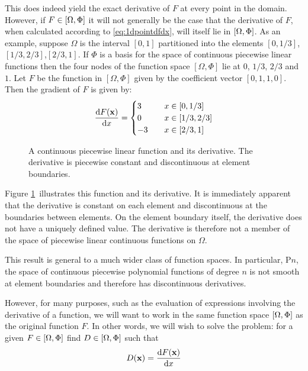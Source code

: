\documentclass[a4paper, 11pt]{book}
\newcommand{\ifhtlatex}[2]{\ifthenelse{\boolean{HTLatex}}{#1}{#2}}
\newcommand{\xfig}[1]{
  \ifhtlatex{
    \texttt{[image: \#1.png]}
  }{
    
  }
}
\begin{document}
This does indeed yield the exact derivative of $F$ at every point in the
domain. However, if $F\in[\Omega,\Phi]$ it will not generally be the case
that the derivative of $F$, when calculated according to
\eqref{eq:1dpointdfdx}, will itself lie in $[\Omega,\Phi]$. As an example,
suppose $\Omega$ is the interval $[0,1]$ partitioned into the elements
$[0,1/3]$,$[1/3, 2/3]$,$[2/3, 1]$. If $\Phi$ is a basis for the space of
continuous piecewise linear functions then the four nodes of the function
space $[\Omega, \Phi]$ lie at $0$, $1/3$, $2/3$ and $1$. Let $F$ be the
function in $[\Omega, \Phi]$ given by the coefficient vector $[0, 1, 1,
0]$. Then the gradient of $F$ is given by:
\begin{equation}
  \frac{\mathrm{d} F(\mathbf{x})}{\mathrm{d} x}=
  \begin{cases}
    3\quad &x\in[0,1/3]\\
    0\quad &x\in[1/3,2/3]\\
    -3\quad &x\in[2/3,1]\\
  \end{cases}
\end{equation}
\begin{figure}[t]
  \centering
  \xfig{linear_1d_derivative}
  \caption{A continuous piecewise linear function and its derivative. The
    derivative is piecewise constant and discontinuous at element boundaries.}
  \label{fig:1dpointdfdx}
\end{figure}
Figure \ref{fig:1dpointdfdx}\ illustrates this function and its derivative.
It is immediately apparent that the derivative is constant on each element
and discontinuous at the boundaries between elements. On the element
boundary itself, the derivative does not have a uniquely defined value. The
derivative is therefore not a member of the space of piecewise linear
continuous functions on $\Omega$. 

This result is general to a much wider class of function spaces. In
particular, P$n$, the space of continuous piecewise polynomial functions of
degree $n$ is not smooth at element boundaries and therefore has
discontinuous derivatives.

However, for many purposes, such
as the evaluation of expressions involving the derivative of a function, we
will want to work in the same function space $[\Omega,\Phi]$ as the original
function $F$. In other words, we will wish to solve the problem: for a given
$F\in[\Omega,\Phi]$ find $D\in[\Omega,\Phi]$ such that
\begin{equation}
  \label{eq:1d_derivative}
  D(\mathbf{x})=\frac{\mathrm{d} F(\mathbf{x})}{\mathrm{d} x}
\end{equation}
\end{document}
